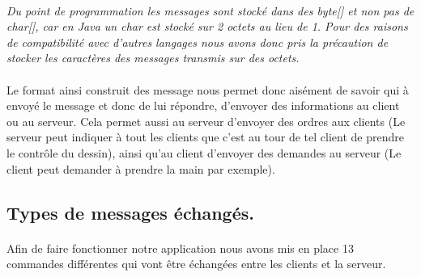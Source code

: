 \documentclass[a4paper,11pt]{article}
\begin{document}
\paragraph{}\textit{Du point de programmation les messages sont stocké dans des byte[] et non pas de char[], car en Java un char est stocké sur 2 octets au lieu de 1. Pour des raisons de compatibilité avec d'autres langages nous avons donc pris la précaution de stocker les caractères des messages transmis sur des octets.}

\paragraph{}Le format ainsi construit des message nous permet donc aisément de savoir qui à envoyé le message et donc de lui répondre, d'envoyer des informations au client ou au serveur. Cela permet aussi au serveur d'envoyer des ordres aux clients (Le serveur peut indiquer à tout les clients que c'est au tour de tel client de prendre le contrôle du dessin), ainsi qu'au client d'envoyer des demandes au serveur (Le client peut demander à prendre la main par exemple).

\subsection{Types de messages échangés.}
\paragraph{}Afin de faire fonctionner notre application nous avons mis en place 13 commandes différentes qui vont être échangées entre les clients et la serveur.
\end{document}
